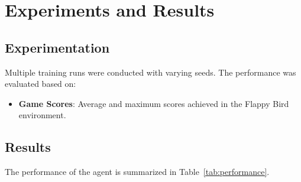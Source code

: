 \documentclass[a4paper,12pt]{article}
\begin{document}
\section{Experiments and Results}
\subsection{Experimentation}
Multiple training runs were conducted with varying seeds. The performance was evaluated based on:
\begin{itemize}
    \item \textbf{Game Scores}: Average and maximum scores achieved in the Flappy Bird environment.
\end{itemize}

\subsection{Results}
The performance of the agent is summarized in Table~\ref{tab:performance}.
\end{document}
